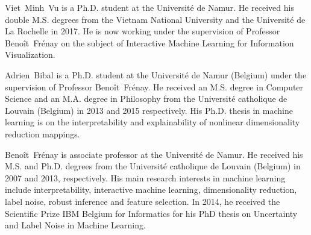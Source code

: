 Viet~Minh~Vu is a Ph.D. student at the Universit\'{e} de Namur.
He received his double M.S. degrees from the Vietnam National University and the Universit\'{e} de La Rochelle in 2017.
He is now working under the supervision of Professor {Beno\^{i}t~Fr\'{e}nay} on the subject of Interactive Machine Learning for Information Visualization.
\endbio

Adrien~Bibal is a Ph.D. student at the Universit\'{e} de Namur (Belgium) under the supervision of Professor {Beno\^{i}t~Fr\'{e}nay}. He received an M.S. degree in Computer Science and an M.A. degree in Philosophy from the Universit\'{e} catholique de Louvain (Belgium) in 2013 and 2015 respectively. His Ph.D. thesis in machine learning is on the interpretability and explainability of nonlinear dimensionality reduction mappings.
\endbio

Beno\^{i}t~Fr\'{e}nay is associate professor at the Universit\'{e} de Namur.  He received his M.S. and Ph.D. degrees from the Universit\'{e} catholique de Louvain (Belgium) in 2007 and 2013, respectively. His main research interests in machine learning include interpretability, interactive machine learning, dimensionality reduction, label noise, robust inference and feature selection. In 2014, he received the Scientific Prize IBM Belgium for Informatics for his PhD thesis on Uncertainty and Label Noise in Machine Learning.
\endbio
